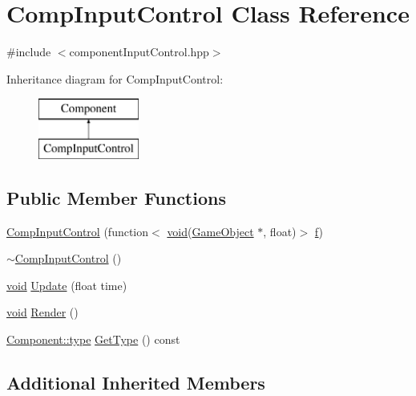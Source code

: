 \hypertarget{class_comp_input_control}{\section{Comp\-Input\-Control Class Reference}
\label{class_comp_input_control}
}


{\ttfamily \#include $<$component\-Input\-Control.\-hpp$>$}

Inheritance diagram for Comp\-Input\-Control\-:\begin{figure}[H]
\begin{center}
\leavevmode
\includegraphics[height=2.000000cm]{class_comp_input_control}
\end{center}
\end{figure}
\subsection*{Public Member Functions}
\begin{DoxyCompactItemize}
\item 
\hyperlink{class_comp_input_control_a3aabdba98654ac10d81cbe02560c8df0}{Comp\-Input\-Control} (function$<$ \hyperlink{_s_d_l__opengles2__gl2ext_8h_ae5d8fa23ad07c48bb609509eae494c95}{void}(\hyperlink{class_game_object}{Game\-Object} $\ast$, float)$>$ \hyperlink{_s_d_l__opengl__glext_8h_a691492ec0bd6383f91200e49f6ae40ed}{f})
\item 
\hyperlink{class_comp_input_control_a09f229c93365187d06c2c9efe6b168fb}{$\sim$\-Comp\-Input\-Control} ()
\item 
\hyperlink{_s_d_l__opengles2__gl2ext_8h_ae5d8fa23ad07c48bb609509eae494c95}{void} \hyperlink{class_comp_input_control_acd26d145112fbbfd2e94582f36e6535c}{Update} (float time)
\item 
\hyperlink{_s_d_l__opengles2__gl2ext_8h_ae5d8fa23ad07c48bb609509eae494c95}{void} \hyperlink{class_comp_input_control_ae451f1ce791bf18d967dd768b164f59c}{Render} ()
\item 
\hyperlink{class_component_ad6d161b6acf7b843b55bb9feac7af71a}{Component\-::type} \hyperlink{class_comp_input_control_a2e4ee7ab44ba39bb4d011af305717ff6}{Get\-Type} () const 
\end{DoxyCompactItemize}
\subsection*{Additional Inherited Members}


